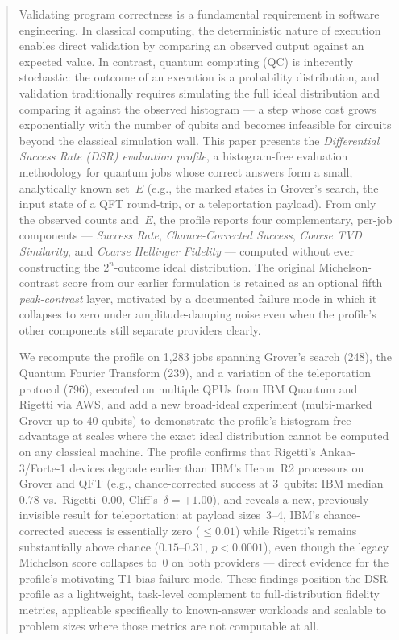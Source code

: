 \begin{abstract}

Validating program correctness is a fundamental requirement in software engineering. In classical computing, the deterministic nature of execution enables direct validation by comparing an observed output against an expected value. In contrast, quantum computing (QC) is inherently stochastic: the outcome of an execution is a probability distribution, and validation traditionally requires simulating the full ideal distribution and comparing it against the observed histogram --- a step whose cost grows exponentially with the number of qubits and becomes infeasible for circuits beyond the classical simulation wall. This paper presents the \emph{Differential Success Rate (DSR) evaluation profile}, a histogram-free evaluation methodology for quantum jobs whose correct answers form a small, analytically known set~$E$ (e.g., the marked states in Grover's search, the input state of a QFT round-trip, or a teleportation payload). From only the observed counts and~$E$, the profile reports four complementary, per-job components --- \emph{Success Rate}, \emph{Chance-Corrected Success}, \emph{Coarse TVD Similarity}, and \emph{Coarse Hellinger Fidelity} --- computed without ever constructing the $2^n$-outcome ideal distribution. The original Michelson-contrast score from our earlier formulation is retained as an optional fifth \emph{peak-contrast} layer, motivated by a documented failure mode in which it collapses to zero under amplitude-damping noise even when the profile's other components still separate providers clearly.

We recompute the profile on 1{,}283 jobs spanning Grover's search (248), the Quantum Fourier Transform (239), and a variation of the teleportation protocol (796), executed on multiple QPUs from IBM Quantum and Rigetti via AWS, and add a new broad-ideal experiment (multi-marked Grover up to 40 qubits) to demonstrate the profile's histogram-free advantage at scales where the exact ideal distribution cannot be computed on any classical machine. The profile confirms that Rigetti's Ankaa-3/Forte-1 devices degrade earlier than IBM's Heron~R2 processors on Grover and QFT (e.g., chance-corrected success at 3~qubits: IBM median~$0.78$ vs.\ Rigetti~$0.00$, Cliff's~$\delta=+1.00$), and reveals a new, previously invisible result for teleportation: at payload sizes~3--4, IBM's chance-corrected success is essentially zero ($\leq 0.01$) while Rigetti's remains substantially above chance ($0.15$--$0.31$, $p<0.0001$), even though the legacy Michelson score collapses to~$0$ on both providers --- direct evidence for the profile's motivating T1-bias failure mode. These findings position the DSR profile as a lightweight, task-level complement to full-distribution fidelity metrics, applicable specifically to known-answer workloads and scalable to problem sizes where those metrics are not computable at all.

\end{abstract}

